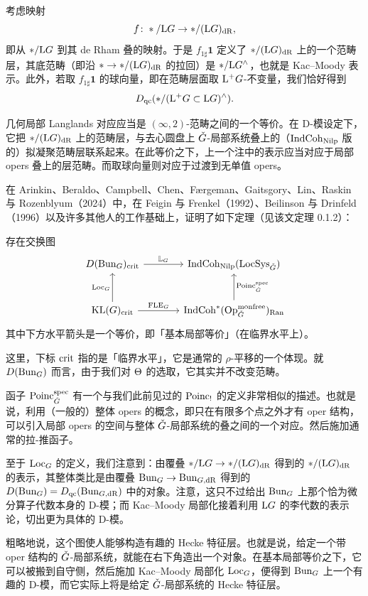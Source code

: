 \begin{remark}
考虑映射
\[
f\colon */\mathrm{L}G\to */(\mathrm{L}G)_{\mathrm{dR}},
\]
即从 $*/\mathrm{L}G$ 到其 de Rham 叠的映射。于是 $f_{1\sharp}\mathbf{1}$ 定义了 $*/(\mathrm{L}G)_{\mathrm{dR}}$ 上的一个范畴层，其底范畴（即沿 $*\to*/(\mathrm{L}G)_{\mathrm{dR}}$ 的拉回）是 $*/\mathrm{L}G^{\wedge}$，也就是 Kac--Moody 表示。此外，若取 $f_{1\sharp}\mathbf{1}$ 的球向量，即在范畴层面取 $\mathrm{L}^{+}G$-不变量，我们恰好得到
\[
D_{\mathrm{qc}}(*/(\mathrm{L}^{+}G\subset\mathrm{L}G)^{\wedge}).
\]
\end{remark}

\begin{remark}
几何局部 Langlands 对应应当是 $(\infty,2)$-范畴之间的一个等价。在 D-模设定下，它把 $*/(\mathrm{L}G)_{\mathrm{dR}}$ 上的范畴层，与去心圆盘上 $\check{G}$-局部系统叠上的（$\operatorname{IndCoh}_{\mathrm{Nilp}}$ 版的）拟凝聚范畴层联系起来。在此等价之下，上一个注中的表示应当对应于局部 opers 叠上的层范畴。而取球向量则对应于过渡到无单值 opers。
\end{remark}

在 Arinkin、Beraldo、Campbell、Chen、Færgeman、Gaitsgory、Lin、Raskin 与 Rozenblyum（2024）中，在 Feigin 与 Frenkel（1992）、Beilinson 与 Drinfeld（1996）以及许多其他人的工作基础上，证明了如下定理（见该文定理 0.1.2）：

\begin{theorem}
存在交换图
\[
\begin{tikzcd}[column sep=large,row sep=large]
D(\Bun_G)_{\crit} \arrow[r,"\mathbb{L}_G"] & \IndCoh_{\Nilp}(\LocSys_{\Gd}) \\
\KL(G)_{\crit} \arrow[r,"\mathrm{FLE}_G"] \arrow[u,"\Loc_G"] & \IndCoh^{*}(\Op^{\monfree}_{\Gd})_{\Ran} \arrow[u,"\Poinc^{\mathrm{spec}}_{\Gd}"']
\end{tikzcd}
\]
其中下方水平箭头是一个等价，即「基本局部等价」（在临界水平上）。
\end{theorem}

这里，下标 $\mathrm{crit}$ 指的是「临界水平」，它是通常的 $\rho$-平移的一个体现。就 $D(\operatorname{Bun}_G)$ 而言，由于我们对 $\Theta$ 的选取，它其实并不改变范畴。

函子 $\mathrm{Poinc}^{\mathrm{spec}}_{\check{G}}$ 有一个与我们此前见过的 $\mathrm{Poinc}_{!}$ 的定义非常相似的描述。也就是说，利用（一般的）整体 opers 的概念，即只在有限多个点之外才有 oper 结构，可以引入局部 opers 的空间与整体 $\check{G}$-局部系统的叠之间的一个对应。然后施加通常的拉-推函子。

至于 $\mathrm{Loc}_G$ 的定义，我们注意到：由覆叠 $*/\mathrm{L}G\to*/(\mathrm{L}G)_{\mathrm{dR}}$ 得到的 $*/(\mathrm{L}G)_{\mathrm{dR}}$ 的表示，其整体类比是由覆叠 $\operatorname{Bun}_G\to\operatorname{Bun}_{G,\mathrm{dR}}$ 得到的 $D(\operatorname{Bun}_G)=D_{\mathrm{qc}}(\operatorname{Bun}_{G,\mathrm{dR}})$ 中的对象。注意，这只不过给出 $\operatorname{Bun}_G$ 上那个恰为微分算子代数本身的 D-模；而 Kac--Moody 局部化接着利用 $\mathrm{L}G$ 的李代数的表示论，切出更为具体的 D-模。

\begin{remark}
粗略地说，这个图使人能够构造有趣的 Hecke 特征层。也就是说，给定一个带 oper 结构的 $\check{G}$-局部系统，就能在右下角造出一个对象。在基本局部等价之下，它可以被搬到自守侧，然后施加 Kac--Moody 局部化 $\mathrm{Loc}_G$，便得到 $\operatorname{Bun}_G$ 上一个有趣的 D-模，而它实际上将是给定 $\check{G}$-局部系统的 Hecke 特征层。
\end{remark}
